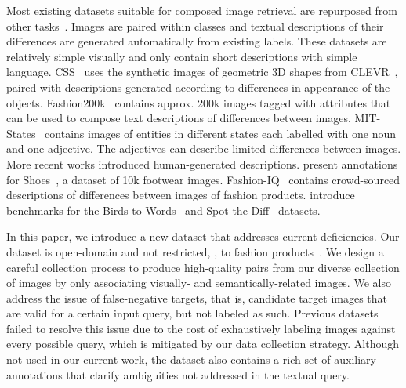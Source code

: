 \documentclass[10pt,twocolumn,letterpaper]{article}
\makeatletter
\renewcommand{\paragraph}{\@startsection{paragraph}{4}{\z@}{1.05ex \@plus 1ex \@minus .2ex}{-1em}{\normalfont\normalsize\bfseries}}
\makeatother
\begin{document}
\paragraph{Datasets for composed image retrieval.}
Most existing datasets suitable for composed image retrieval are repurposed from other tasks~\cite{Isola2015DiscoveringSA_mitstates,han2017automatic_fashion200k,Vo_2019_tirg}. Images are paired within classes and textual descriptions of their differences are generated automatically from existing labels. 
These datasets are relatively simple visually and only contain short descriptions with simple language.
CSS~\cite{Vo_2019_tirg} uses the synthetic images of geometric 3D shapes from CLEVR~\cite{clevr}, paired with descriptions generated according to differences in appearance of the objects.
Fashion200k~\cite{han2017automatic_fashion200k} contains approx. 200k images tagged with attributes that can be used to compose text descriptions of differences between images. 
MIT-States~\cite{Isola2015DiscoveringSA_mitstates} contains images of entities in different states each labelled with one noun and one adjective. The adjectives can describe limited differences between images.
More recent works introduced human-generated descriptions.
\citet{guo2018dialog} present annotations for Shoes~\cite{10.5555/1886063.1886114_shoes}, a dataset of 10k footwear images. 
Fashion-IQ~\cite{fashioniq} contains crowd-sourced descriptions of differences between images of fashion products. 
\citet{dodds2020modality_maaf} introduce benchmarks for the Birds-to-Words~\cite{forbes2019neural_birds} and Spot-the-Diff~\cite{jhamtani2018learning_spotthediff} datasets.

In this paper, we introduce a new dataset that addresses current deficiencies.
Our dataset is open-domain and not restricted, \eg, to fashion products~\cite{han2017automatic_fashion200k,fashioniq,10.5555/1886063.1886114_shoes}.
We design a careful collection process to produce high-quality pairs from our diverse collection of images by only associating visually- and semantically-related images.
We also address the issue of false-negative targets, that is, candidate target images that are valid for a certain input query, but not labeled as such.
Previous datasets failed to resolve this issue due to the cost of exhaustively labeling images against every possible query, which is mitigated by our data collection strategy.
Although not used in our current work, the dataset also contains a rich set of auxiliary annotations that clarify ambiguities not addressed in the textual query.
\end{document}
